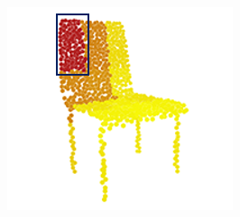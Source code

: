 \documentclass[letterpaper]{article} %
\begin{document}
\begin{figure}[htbp]
\begin{center}
\begin{minipage}[b]{0.8\linewidth}
\begin{center}
\begin{minipage}[b]{0.12\linewidth}
\begin{center}
\end{center}
\end{minipage}
\begin{minipage}[b]{0.12\linewidth}
\begin{center}
\includegraphics[width=1.0\linewidth]{images/atten_pic/chair_attention_3.png}
\end{center}
\end{minipage}\\
\begin{minipage}[b]{0.15\linewidth}
\begin{center}
\end{center}
\end{minipage}
\begin{minipage}[b]{0.12\linewidth}
\begin{center}

\end{center}
\end{minipage}
\end{center}
\end{minipage}
\end{center}
\end{figure}
\end{document}
